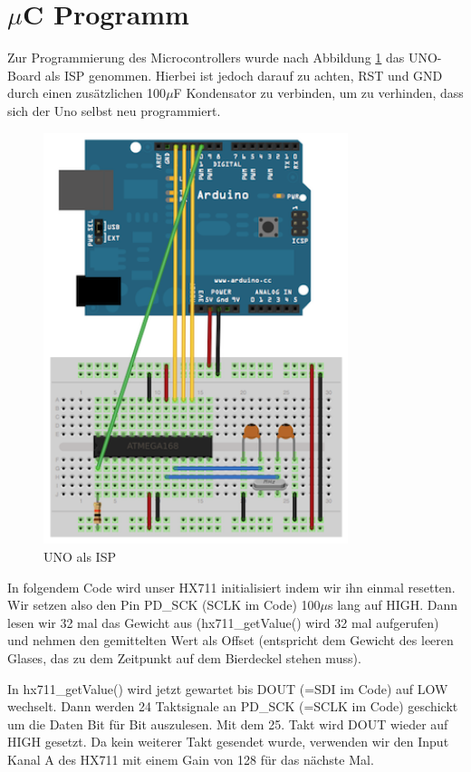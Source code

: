 \documentclass[12pt,journal]{IEEEtran}
\begin{document}
\section{$\mu$C Programm}
Zur Programmierung des Microcontrollers wurde nach Abbildung \ref{fig_isp} das UNO-Board als ISP genommen.
Hierbei ist jedoch darauf zu achten, RST und GND durch einen zusätzlichen 100$\mu$F Kondensator zu verbinden, um zu verhinden, dass sich der Uno selbst neu programmiert.
\begin{figure}[!h]
  \centering
    \includegraphics[width=3.5in]{images/isp.png}
    \caption{UNO als ISP}
  \label{fig_isp}
\end{figure}

In folgendem Code wird unser HX711 initialisiert indem wir ihn einmal resetten.
Wir setzen also den Pin PD\_SCK (SCLK im Code) 100$\mu$s lang auf HIGH. Dann lesen wir 32 mal das
Gewicht aus (hx711\_getValue() wird 32 mal aufgerufen) und nehmen den gemittelten Wert als
Offset (entspricht dem Gewicht des leeren Glases,
das zu dem Zeitpunkt auf dem Bierdeckel stehen muss).

\hfil

\hfil

In hx711\_getValue() wird jetzt gewartet bis DOUT (=SDI im Code) auf LOW wechselt.
Dann werden 24 Taktsignale an PD\_SCK (=SCLK im Code) geschickt um die Daten Bit für Bit auszulesen.
Mit dem 25. Takt wird DOUT wieder auf HIGH gesetzt. Da kein weiterer Takt gesendet wurde,
verwenden wir den Input Kanal A des HX711 mit einem Gain von 128 für das nächste Mal.
\end{document}
